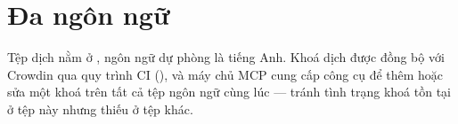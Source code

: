 \section{Đa ngôn ngữ}

Tệp dịch nằm ở , ngôn ngữ dự phòng là tiếng Anh. Khoá dịch được
đồng bộ với Crowdin qua quy trình CI (), và máy chủ MCP cung cấp
công cụ  để thêm hoặc sửa một khoá trên tất cả tệp ngôn ngữ cùng
lúc — tránh tình trạng khoá tồn tại ở tệp này nhưng thiếu ở tệp khác.
